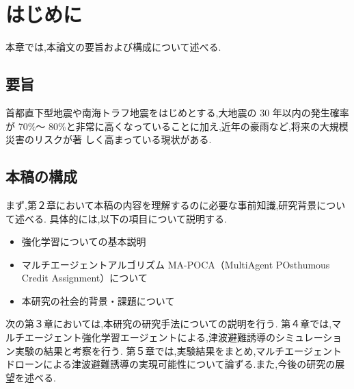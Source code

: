 \chapter{はじめに}
本章では,本論文の要旨および構成について述べる.
\section{要旨}
首都直下型地震や南海トラフ地震をはじめとする,大地震の 30 年以内の発生確率が 70\%～
80\%と非常に高くなっていることに加え,近年の豪雨など,将来の大規模災害のリスクが著
しく高まっている現状がある.
\section{本稿の構成}
まず,第２章において本稿の内容を理解するのに必要な事前知識,研究背景について述べる.
具体的には,以下の項目について説明する.
\begin{itemize}
  \item 強化学習についての基本説明
  \item マルチエージェントアルゴリズム MA-POCA（MultiAgent POsthumous Credit Assignment）について
  \item 本研究の社会的背景・課題について
\end{itemize}

次の第３章においては,本研究の研究手法についての説明を行う.
第４章では,マルチエージェント強化学習エージェントによる,津波避難誘導のシミュレーション実験の結果と考察を行う.
第５章では,実験結果をまとめ,マルチエージェントドローンによる津波避難誘導の実現可能性について論ずる.また,今後の研究の展望を述べる.
